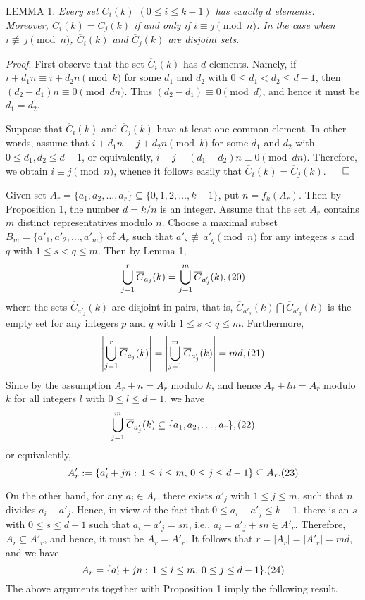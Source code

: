 \documentclass[12pt]{amsart}
\begin{document}
{L{\scriptsize EMMA} 1. {\it Every set $\overline{C}_i(k)$ 
$(0\le i\le k-1)$ has exactly $d$ elements.
Moreover, $\overline{C}_i(k)=\overline{C}_j(k)$ if and only if 
$i\equiv j \pmod{n}$. In the case when $i\not\equiv\, j\pmod{n}$,
$\overline{C}_i(k)$ and $\overline{C}_j(k)$ are disjoint sets}.


\vspace{2mm} 
 
{\it Proof}. First observe  that the set $\overline{C}_i(k)$ has
$d$ elements. Namely, if $i+d_1n\equiv i+d_2n \pmod{k}$ for some
$d_1$ and $d_2$ with $0\le d_1<d_2\le d-1$, then $(d_2-d_1)n\equiv 
0\pmod{dn}$. Thus $(d_2-d_1)\equiv 
0\pmod{d}$, and hence it must be $d_1=d_2$.

Suppose that $\overline{C}_i(k)$ and $\overline{C}_j(k)$ have
at least one common element. In other words, assume that
$i+d_1n\equiv j+d_2n\pmod{k}$ for some
$d_1$ and $d_2$ with $0\le d_1,d_2\le d-1$, or equivalently,
$i-j+(d_1-d_2)n\equiv 0\pmod{dn}$. Therefore, we obtain
$i\equiv j\pmod{n}$, whence it follows easily that 
$\overline{C}_i(k)=\overline{C}_j(k)$.
\hfill$\qed$

\vspace{2mm} 

 
 Given set $A_r=\{a_1,a_2,\ldots,a_r\}\subseteq 
\{0,1,2,\ldots,k-1\}$, put $n=f_k(A_r)$.  Then by Proposition 1,
 the number $d=k/n$ is an integer. Assume that the set $A_r$ contains $m$ 
distinct representatives modulo $n$. Choose a maximal subset  
$B_m=\{a'_1,a'_2,\ldots,a'_m\}$ of  $A_r$ such that
$a'_s\not\equiv\, a'_q\pmod{n}$ for any integers $s$ and $q$ with 
$1\le s<q\le m$. Then by  Lemma 1,
    $$
\bigcup_{j=1}^r\overline{C}_{a_j}(k)=\bigcup_{j=1}^m\overline{C}_{a'_j}(k),
\relax(20)
 $$
where  the sets $\overline{C}_{a'_j}(k)$ are disjoint in pairs, that is, 
 $\overline{C}_{a'_s}(k)\bigcap \overline{C}_{a'_q}(k)$ is the empty set
   for any integers $p$ and $q$ with $1\le s<q\le m$. Furthermore,
 $$
\left|\bigcup_{j=1}^r\overline{C}_{a_j}(k)\right|=\left|\bigcup_{j=1}^m
\overline{C}_{a'_j}(k)
\right|=md,\relax(21)
 $$
Since by the assumption $A_r+n=A_r$ modulo $k$, and hence 
$A_r+ln=A_r$ modulo $k$ for all integers $l$ with  $0\le l\le d-1$, we have
 $$
\bigcup_{j=1}^m\overline{C}_{a'_j}(k)\subseteq \{a_1,a_2,\ldots,a_r\},
\relax(22)
 $$
or equivalently,
 $$
A_r':=\{a'_i +jn:\, 1\le i\le m,\, 0\le j\le d-1\}\subseteq A_r.\relax(23)
 $$

\indent On the other hand, for any $a_i\in A_r$, there exists $a'_j$ with
$1\le j\le m$, such that $n$ divides $a_i- a'_j$. Hence, in view of the fact that
$0\le a_i- a'_j\le k-1$, there is an $s$ with $0\le s\le d-1$ such that
$a_i- a'_j=sn$, i.e., $a_i= a'_j+sn\in A'_r$. Therefore, $A_r\subseteq A'_r$,
and hence, it must be $A_r=A'_r$.  It follows that
$r=|A_r|=|A'_r|=md$, and we have
 $$
A_r=\{a'_i +jn:\, 1\le i\le m,\, 0\le j\le d-1\}.\relax(24)
 $$
The above arguments together with Proposition 1 imply the 
following result. 


}
\end{document}
